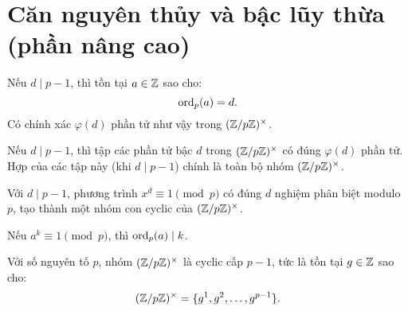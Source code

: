\documentclass[../imo-training-open-book.tex]{subfiles}
\begin{document}
\newpage

\section{Căn nguyên thủy và bậc lũy thừa (phần nâng cao)}

\begin{lemma*}
    \label{lemma:exists-order-d}
    Nếu \( d \mid p - 1 \), thì tồn tại \( a \in \mathbb Z \) sao cho:
    \[
        \operatorname{ord}_p(a) = d.
    \]
    Có chính xác \( \varphi(d) \) phần tử như vậy trong \( (\mathbb Z/p\mathbb Z)^\times \).
\end{lemma*}

\vspace{1em}

\begin{theorem*}
    \label{theorem:residue-class-order-d}
    Nếu \( d \mid p - 1 \), thì tập các phần tử bậc \( d \) trong \( (\mathbb Z/p\mathbb Z)^\times \) có đúng \( \varphi(d) \) phần tử. Hợp của các tập này (khi \( d \mid p - 1 \)) chính là toàn bộ nhóm \( (\mathbb Z/p\mathbb Z)^\times \).
\end{theorem*}

\vspace{1em}

\begin{theorem*}
    \label{theorem:roots-of-unity-mod-p}
    Với \( d \mid p - 1 \), phương trình \( x^d \equiv 1 \pmod{p} \) có đúng \( d \) nghiệm phân biệt modulo \( p \), tạo thành một nhóm con cyclic của \( (\mathbb Z/p\mathbb Z)^\times \).
\end{theorem*}

\vspace{1em}

\begin{lemma*}
    \label{lemma:order-divides-implies-root}
    Nếu \( a^k \equiv 1 \pmod{p} \), thì \( \operatorname{ord}_p(a) \mid k \).
\end{lemma*}

\vspace{1em}

\begin{theorem*}
    \label{theorem:multiplicative-group-structure}
    Với số nguyên tố \( p \), nhóm \( (\mathbb Z/p\mathbb Z)^\times \) là cyclic cấp \( p - 1 \), tức là tồn tại \( g \in \mathbb Z \) sao cho:
    \[
        (\mathbb Z/p\mathbb Z)^\times = \{ g^1, g^2, \ldots, g^{p-1} \}.
    \]
\end{theorem*}
\end{document}
